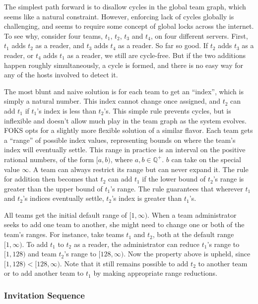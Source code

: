 The simplest path forward is to disallow cycles in the global team
graph, which seems like a natural constraint. However, enforcing
lack of cycles globally is challenging, and seems to require some
concept of global locks across the internet. To see why, consider
four teams, $t_1$, $t_2$, $t_3$ and $t_4$, on four different servers.
First, $t_1$ adds $t_2$ as a reader, and $t_3$ adds $t_4$ as a reader.
So far so good. If $t_2$ adds $t_3$ as a reader, or $t_4$ adds
$t_1$ as a reader, we still are cycle-free.  But if the two additions
happen roughly simultaneously, a cycle is formed, and there is no easy
way for any of the hosts involved to detect it.

The most blunt and naive solution is for each team to get an ``index'', which
is simply a natural number. This index cannot change once assigned, and
$t_2$ can add $t_1$ if $t_1$'s index is less than $t_2$'s. This simple
rule prevents cycles, but is inflexible and doesn't allow much play in the team
graph as the system evolves. FOKS opts for a slightly more flexible solution of
a similar flavor. Each team gets a ``range'' of possible index values,
representing bounds on where the team's index will eventually settle.  This
range in practice is an interval on the positive rational numbers, of the form
$[a,b)$, where $a,b \in \mathbb{Q^{+}}$. $b$ can take on the special value $\infty$.
A team can always restrict its range but can never expand it. The rule for
addition then becomes that $t_2$ can add $t_1$ if the lower bound of $t_2$'s
range is greater than the upper bound of $t_1$'s range. The rule guarantees that
wherever $t_1$ and $t_2$'s indices eventually settle, $t_2$'s index is greater
than $t_1$'s.

All teams get the initial default range of $[1,\infty)$. When a team administrator
seeks to add one team to another, she might need to change one or both of the team's
ranges. For instance, take teams $t_1$ and $t_2$, both at the default range $[1,\infty)$.
To add $t_1$ to $t_2$ as a reader, the administrator can reduce $t_1$'s range to $[1, 128)$
and team $t_2$'s range to $[128, \infty)$. Now the property above is upheld,
since $[1,128) < [128, \infty)$.  Note that it still remains possible to add $t_2$ to 
another team or to add another team to $t_1$ by making appropriate range reductions.

\subsubsection{Invitation Sequence}
\label{sec:invitation}

